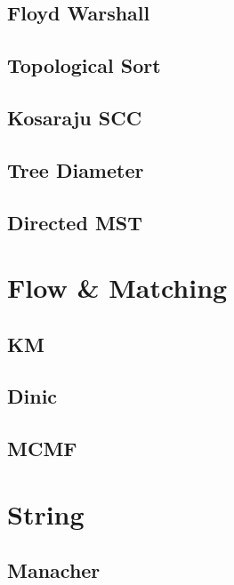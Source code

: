     \subsection{Floyd Warshall}
        
    \subsection{Topological Sort}
        
    \subsection{Kosaraju SCC}
        
    \subsection{Tree Diameter}
        
    \subsection{Directed MST}
        

\section{Flow \& Matching}
    \subsection{KM}
        
    \subsection{Dinic}
        
    \subsection{MCMF}
        

\section{String}
    \subsection{Manacher}
        

